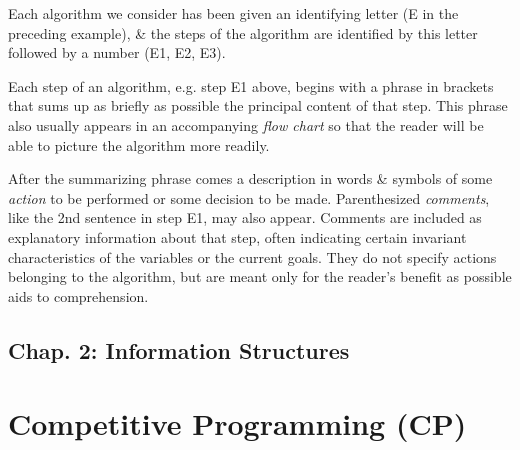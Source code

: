 \documentclass{article}
\begin{document}
Each algorithm we consider has been given an identifying letter (E in the preceding example), \& the steps of the algorithm are identified by this letter followed by a number (E1, E2, E3).

Each step of an algorithm, e.g. step E1 above, begins with a phrase in brackets that sums up as briefly as possible the principal content of that step. This phrase also usually appears in an accompanying {\it flow chart} so that the reader will be able to picture the algorithm more readily.

After the summarizing phrase comes a description in words \& symbols of some {\it action} to be performed or some decision to be made. Parenthesized {\it comments}, like the 2nd sentence in step E1, may also appear. Comments are included as explanatory information about that step, often indicating certain invariant characteristics of the variables or the current goals. They do not specify actions belonging to the algorithm, but are meant only for the reader's benefit as possible aids to comprehension.

\subsection{Chap. 2: Information Structures}


\section{Competitive Programming (CP)}
\end{document}
